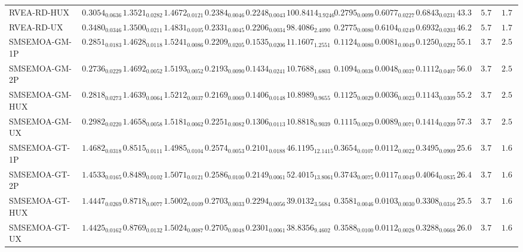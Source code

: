 \documentclass[11pt,a4paper]{article}
\begin{document}
\begin{table}[H]
{\begin{tabular}{lcccccccccccc}
RVEA-RD-HUX & $0.3054_{0.0636}$ & $1.3521_{0.0282}$ & $1.4672_{0.0121}$ & $0.2384_{0.0046}$ & $0.2248_{0.0043}$ & $100.8414_{3.9246}$ & $0.2795_{0.0099}$ & $0.6077_{0.0227}$ & $0.6843_{0.0231}$ & $43.33$ & $5.78$ & $1.78$ \\
RVEA-RD-UX & $0.3480_{0.0346}$ & $1.3500_{0.0211}$ & $1.4831_{0.0105}$ & $0.2331_{0.0045}$ & $0.2206_{0.0034}$ & $98.4086_{2.4090}$ & $0.2775_{0.0080}$ & $0.6104_{0.0249}$ & $0.6932_{0.0203}$ & $46.22$ & $5.78$ & $1.78$ \\
SMSEMOA-GM-1P & $0.2851_{0.0183}$ & $1.4628_{0.0118}$ & $1.5241_{0.0086}$ & $0.2209_{0.0205}$ & $0.1535_{0.0206}$ & $11.1607_{1.2551}$ & $0.1124_{0.0080}$ & $0.0081_{0.0049}$ & $0.1250_{0.0292}$ & $55.11$ & $3.78$ & $2.56$ \\
SMSEMOA-GM-2P & $0.2736_{0.0229}$ & $1.4692_{0.0052}$ & $1.5193_{0.0052}$ & $0.2193_{0.0090}$ & $0.1434_{0.0241}$ & $10.7688_{1.6803}$ & $0.1094_{0.0038}$ & $0.0048_{0.0037}$ & $0.1112_{0.0407}$ & $56.00$ & $3.78$ & $2.56$ \\
SMSEMOA-GM-HUX & $0.2818_{0.0273}$ & $1.4639_{0.0064}$ & $1.5212_{0.0037}$ & $0.2169_{0.0069}$ & $0.1406_{0.0148}$ & $10.8989_{0.9655}$ & $0.1125_{0.0029}$ & $0.0036_{0.0023}$ & $0.1143_{0.0309}$ & $55.22$ & $3.78$ & $2.56$ \\
SMSEMOA-GM-UX & $0.2982_{0.0220}$ & $1.4658_{0.0058}$ & $1.5181_{0.0062}$ & $0.2251_{0.0082}$ & $0.1306_{0.0113}$ & $10.8818_{0.9039}$ & $0.1115_{0.0029}$ & $0.0089_{0.0071}$ & $0.1414_{0.0209}$ & $57.33$ & $3.78$ & $2.56$ \\
SMSEMOA-GT-1P & $1.4682_{0.0318}$ & $0.8515_{0.0111}$ & $1.4985_{0.0104}$ & $0.2574_{0.0053}$ & $0.2101_{0.0188}$ & $46.1195_{12.1415}$ & $0.3654_{0.0107}$ & $0.0112_{0.0022}$ & $0.3495_{0.0909}$ & $25.61$ & $3.78$ & $\mathbf{1.67}$ \\
SMSEMOA-GT-2P & $1.4533_{0.0165}$ & $0.8489_{0.0102}$ & $1.5071_{0.0121}$ & $0.2586_{0.0100}$ & $0.2149_{0.0061}$ & $52.4015_{13.8061}$ & $0.3743_{0.0075}$ & $0.0117_{0.0049}$ & $0.4064_{0.0835}$ & $26.44$ & $3.78$ & $\mathbf{1.67}$ \\
SMSEMOA-GT-HUX & $1.4447_{0.0269}$ & $0.8718_{0.0077}$ & $1.5002_{0.0109}$ & $0.2703_{0.0033}$ & $0.2294_{0.0056}$ & $39.0132_{3.5684}$ & $0.3581_{0.0046}$ & $0.0103_{0.0030}$ & $0.3308_{0.0316}$ & $\mathbf{25.56}$ & $3.78$ & $\mathbf{1.67}$ \\
SMSEMOA-GT-UX & $1.4425_{0.0162}$ & $0.8769_{0.0132}$ & $1.5024_{0.0087}$ & $0.2705_{0.0048}$ & $0.2301_{0.0061}$ & $38.8356_{9.4602}$ & $0.3588_{0.0100}$ & $0.0112_{0.0028}$ & $0.3288_{0.0668}$ & $26.06$ & $3.78$ & $\mathbf{1.67}$ \\

\end{tabular}}
\end{table}
\end{document}
